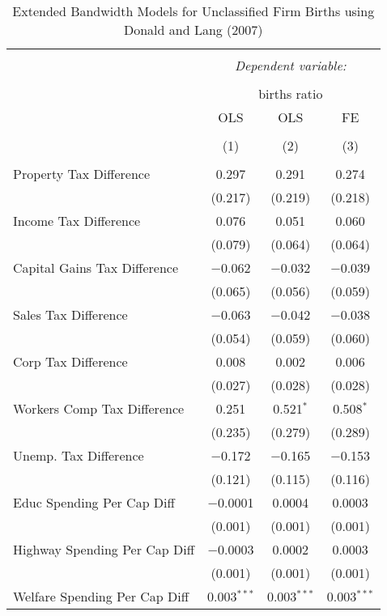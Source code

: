 
\begin{table}[!htbp] \centering 
  \caption{Extended Bandwidth Models for  Unclassified Firm Births using Donald and Lang (2007)} 
  \label{} 
\begin{tabular}{@{\extracolsep{5pt}}lccc} 
\\[-1.8ex]\hline 
\hline \\[-1.8ex] 
 & \multicolumn{3}{c}{\textit{Dependent variable:}} \\ 
\cline{2-4} 
\\[-1.8ex] & \multicolumn{3}{c}{births ratio} \\ 
 & OLS & OLS & FE \\ 
\\[-1.8ex] & (1) & (2) & (3)\\ 
\hline \\[-1.8ex] 
 Property Tax Difference & 0.297 & 0.291 & 0.274 \\ 
  & (0.217) & (0.219) & (0.218) \\ 
  Income Tax Difference & 0.076 & 0.051 & 0.060 \\ 
  & (0.079) & (0.064) & (0.064) \\ 
  Capital Gains Tax Difference & $-$0.062 & $-$0.032 & $-$0.039 \\ 
  & (0.065) & (0.056) & (0.059) \\ 
  Sales Tax Difference & $-$0.063 & $-$0.042 & $-$0.038 \\ 
  & (0.054) & (0.059) & (0.060) \\ 
  Corp Tax Difference & 0.008 & 0.002 & 0.006 \\ 
  & (0.027) & (0.028) & (0.028) \\ 
  Workers Comp Tax Difference & 0.251 & 0.521$^{*}$ & 0.508$^{*}$ \\ 
  & (0.235) & (0.279) & (0.289) \\ 
  Unemp. Tax Difference & $-$0.172 & $-$0.165 & $-$0.153 \\ 
  & (0.121) & (0.115) & (0.116) \\ 
  Educ Spending Per Cap Diff & $-$0.0001 & 0.0004 & 0.0003 \\ 
  & (0.001) & (0.001) & (0.001) \\ 
  Highway Spending Per Cap Diff & $-$0.0003 & 0.0002 & 0.0003 \\ 
  & (0.001) & (0.001) & (0.001) \\ 
  Welfare Spending Per Cap Diff & 0.003$^{***}$ & 0.003$^{***}$ & 0.003$^{***}$ \\ 

\end{tabular}
\end{table}
